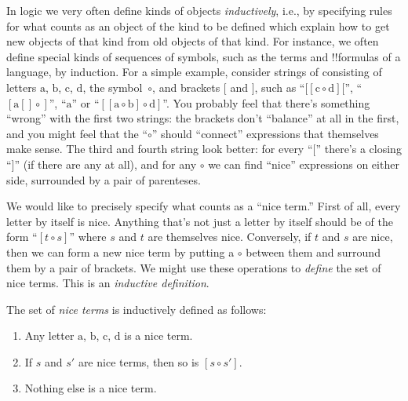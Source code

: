 \documentclass[../../../include/open-logic-section]{subfiles}
\begin{document}


In logic we very often define kinds of objects \emph{inductively},
i.e., by specifying rules for what counts as an object of the kind to
be defined which explain how to get new objects of that kind from old
objects of that kind.  For instance, we often define special kinds of
sequences of symbols, such as the terms and !!{formula}s of a
language, by induction.  For a simple example, consider strings of
consisting of letters $\mathrm{a}$, $\mathrm{b}$, $\mathrm{c}$,
$\mathrm{d}$, the symbol~$\circ$, and brackets $[$ and $]$, such as
``$[[\mathrm{c} \circ \mathrm{d}][$'', ``$[\mathrm{a}[]\circ]$'',
``$\mathrm{a}$'' or ``$[[\mathrm{a} \circ \mathrm{b}]\circ
\mathrm{d}]$''.  You probably feel that there's something
``wrong'' with the first two strings: the brackets don't
``balance'' at all in the first, and you might feel that the
``$\circ$'' should ``connect'' expressions that themselves make
sense. The third and fourth string look better: for every ``$[$''
there's a closing ``$]$'' (if there are any at all), and for any
$\circ$ we can find ``nice'' expressions on either side,
surrounded by a pair of parenteses.

We would like to precisely specify what counts as a ``nice term.''
First of all, every letter by itself is nice.  Anything that's not
just a letter by itself should be of the form ``$[t \circ s]$'' where
$s$ and $t$ are themselves nice. Conversely, if $t$ and $s$ are nice,
then we can form a new nice term by putting a $\circ$ between them and
surround them by a pair of brackets.  We might use these operations
to \emph{define} the set of nice terms.  This is an \emph{inductive
  definition}.

\begin{defn}
  The set of \emph{nice terms} is inductively defined as follows:
  \begin{enumerate}
  \item Any letter $\mathrm{a}$, $\mathrm{b}$, $\mathrm{c}$,
    $\mathrm{d}$ is a nice term.
  \item If $s$ and $s'$ are nice terms, then so
    is $[s \circ s']$.
  \item Nothing else is a nice term.
  \end{enumerate}
\end{defn}
\end{document}
